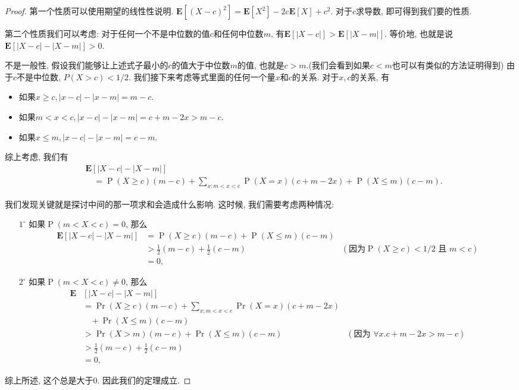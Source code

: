 \begin{proof}
    第一个性质可以使用期望的线性性说明. $\mathbf{E}\left[(X-c)^2\right]=\mathbf{E}\left[X^2\right]-2 c \mathbf{E}[X]+c^2$. 对于$c$求导数, 即可得到我们要的性质. 

    第二个性质我们可以考虑: 对于任何一个不是中位数的值$c$和任何中位数$m$, 有$\mathbf{E}[|X-c|]>\mathbf{E}[|X-m|]$. 等价地, 也就是说$\mathbf{E}[|X-c|-|X-m|]>0$. 

    不是一般性, 假设我们能够让上述式子最小的$c$的值大于中位数$m$的值, 也就是$c>m$.(我们会看到如果$c<m$也可以有类似的方法证明得到) 由于$c$不是中位数, $P(X>c)<1/2$. 我们接下来考虑等式里面的任何一个量$x$和$c$的关系. 对于$x,c$的关系, 有
    \begin{itemize}
        \item 如果$x \geq c,|x-c|-|x-m|=m-c$.
        \item 如果$m<x<c,|x-c|-|x-m|=c+m-2x>m-c$.
        \item 如果$x \leq m,|x-c|-|x-m|=c-m$.
    \end{itemize}

    综上考虑, 我们有
    $$\begin{aligned} & \mathbf{E}[|X-c|-|X-m|] \\ & \quad=\operatorname{P}(X \geq c)(m-c)+\sum_{x: m<x<c} \operatorname{P}(X=x)(c+m-2 x)+\operatorname{P}(X \leq m)(c-m) .\end{aligned}$$

    我们发现关键就是探讨中间的那一项求和会造成什么影响. 这时候, 我们需要考虑两种情况:
    \begin{itemize}
        \item [$1^\circ$] 如果$\operatorname{P}(m<X<c)=0$, 那么$$
        \begin{aligned}
        \mathbf{E}[|X-c|-|X-m|] & =\operatorname{P}(X \geq c)(m-c)+\operatorname{P}(X \leq m)(c-m) \\
        & >\frac{1}{2}(m-c)+\frac{1}{2}(c-m) &(\text{因为}\operatorname{P}(X \geq c)<1 / 2 \text { 且 } m<c)\\
        & =0,
        \end{aligned}
        $$
        \item [$2^\circ$] 如果$\operatorname{P}(m<X<c)\neq 0$, 那么
        $$\begin{aligned}
            \mathbf{E} & {[|X-c|-|X-m|] } \\
            & =\operatorname{Pr}(X \geq c)(m-c)+\sum_{x: m<x<c} \operatorname{Pr}(X=x)(c+m-2 x)\\
            &~~~~+\operatorname{Pr}(X \leq m)(c-m) \\
            & >\operatorname{Pr}(X>m)(m-c)+\operatorname{Pr}(X \leq m)(c-m) &(\text{因为 }\forall x. c+m-2 x>m-c)\\
            & >\frac{1}{2}(m-c)+\frac{1}{2}(c-m) \\
            & =0,
            \end{aligned}$$
    \end{itemize}

    综上所述, 这个总是大于0. 因此我们的定理成立. 
\end{proof}

